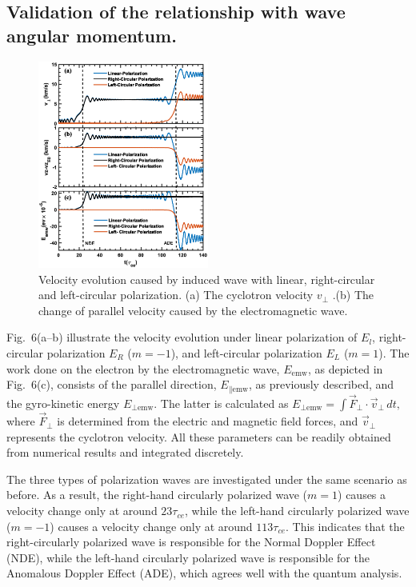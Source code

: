 \documentclass{cpbtex3}
\begin{document}
\subsection{Validation of the relationship with wave angular momentum. }
\begin{figure}[ht]
\centering
\includegraphics[width=0.5\textwidth]{Figure6.eps}%
\caption{Velocity evolution caused by induced wave with linear, right-circular and left-circular polarization. (a) The cyclotron velocity $v_\perp$ .(b) The change of parallel velocity caused by the electromagnetic wave.}
    \label{fig:6}
\end{figure}

Fig.~6(a--b) illustrate the velocity evolution under linear polarization of \( E_l \), right-circular polarization \( E_R \) (\( m = -1 \)), and left-circular polarization \( E_L \) (\( m = 1 \)). The work done on the electron by the electromagnetic wave, \( E_{\text{emw}} \), as depicted in Fig.~6(c), consists of the parallel direction, \( E_{\parallel\text{emw}} \), as previously described, and the gyro-kinetic energy \( E_{\perp\text{emw}} \). The latter is calculated as
\(
E_{\perp\text{emw}} = \int \vec{F}_{\perp} \cdot \vec{v}_{\perp} \, dt,
\)
where \( \vec{F}_{\perp} \) is determined from the electric and magnetic field forces, and \( \vec{v}_{\perp} \) represents the cyclotron velocity. All these parameters can be readily obtained from numerical results and integrated discretely.

The three types of polarization waves are investigated under the same scenario as before. As a result, the right-hand circularly polarized wave (\( m = 1 \)) causes a velocity change only at around \( 23\tau_{ce} \), while the left-hand circularly polarized wave (\( m = -1 \)) causes a velocity change only at around \( 113\tau_{ce} \). This indicates that the right-circularly polarized wave is responsible for the Normal Doppler Effect (NDE), while the left-hand circularly polarized wave is responsible for the Anomalous Doppler Effect (ADE), which agrees well with the quantum analysis.
\end{document}
